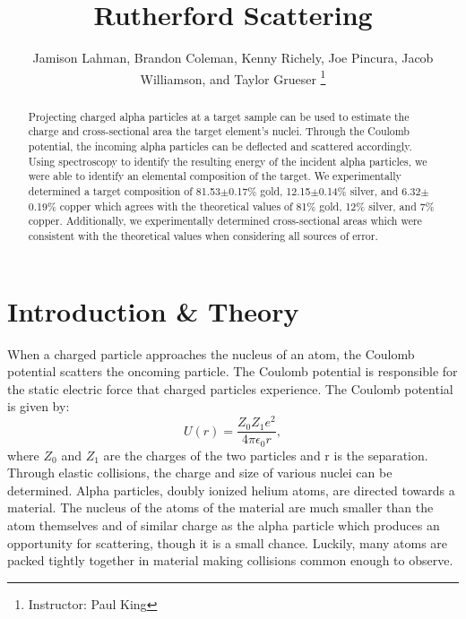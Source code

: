\documentclass[10pt]{IEEEtran}
\begin{document}
    \title{Rutherford Scattering}
    \author{Jamison Lahman, Brandon Coleman, Kenny Richely, Joe Pincura, Jacob Williamson, and Taylor Grueser
    \thanks{Instructor: Paul King}}
    \maketitle

\begin{abstract}
Projecting charged alpha particles at a target sample can be used to estimate the charge and cross-sectional area the target element's nuclei. Through the Coulomb potential, the incoming alpha particles can be deflected and scattered accordingly. Using spectroscopy to identify the resulting energy of the incident alpha particles, we were able to identify an elemental composition of the target. We experimentally determined a target composition of 81.53$\pm$0.17\% gold, 12.15$\pm$0.14\% silver, and 6.32$\pm$0.19\% copper which agrees with the theoretical values of 81\% gold, 12\% silver, and 7\% copper. Additionally, we experimentally determined cross-sectional areas which were consistent with the theoretical values when considering all sources of error.
\end{abstract}
\section{Introduction \& Theory}
When a charged particle approaches the nucleus of an atom, the Coulomb potential scatters the oncoming particle. The Coulomb potential is responsible for the static electric force that charged particles experience. The Coulomb potential is given by:
\begin{equation}
U(r) = \frac{Z_0Z_1 e^2}{4\pi\epsilon_0r},
\end{equation}
where $Z_0$ and $Z_1$ are the charges of the two particles and r is the separation\cite{blackboard}. Through elastic collisions, the charge and size of various nuclei can be determined. Alpha particles, doubly ionized helium atoms, are directed towards a material. The nucleus of the atoms of the material are much smaller than the atom themselves and of similar charge as the alpha particle which produces an opportunity for scattering, though it is a small chance. Luckily, many atoms are packed tightly together in  material making collisions common enough to observe.
\end{document}
